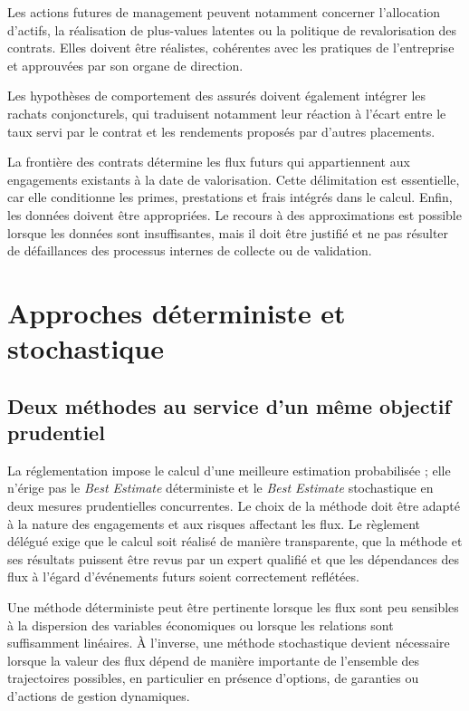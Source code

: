 Les actions futures de management peuvent notamment concerner l'allocation 
d'actifs, la réalisation de plus-values latentes ou la politique de 
revalorisation des contrats. Elles doivent être réalistes, cohérentes 
avec les pratiques de l'entreprise et approuvées par son organe de direction.

Les hypothèses de comportement des assurés doivent également intégrer les 
rachats conjoncturels, qui traduisent notamment leur réaction à l'écart entre 
le taux servi par le contrat et les rendements proposés par d'autres placements.

La frontière des contrats détermine les flux futurs qui appartiennent aux
engagements existants à la date de valorisation. Cette délimitation est
essentielle, car elle conditionne les primes, prestations et frais intégrés dans
le calcul. Enfin, les données doivent être appropriées.
Le recours à des approximations est possible lorsque les données sont
insuffisantes, mais il doit être justifié et ne pas résulter de défaillances des
processus internes de collecte ou de validation.

\section{Approches déterministe et stochastique}

\subsection{Deux méthodes au service d'un même objectif prudentiel}

La réglementation impose le calcul d'une meilleure estimation probabilisée ;
elle n'érige pas le \textit{Best Estimate} déterministe et le
\textit{Best Estimate} stochastique en deux mesures prudentielles concurrentes.
Le choix de la méthode doit être adapté à la nature des engagements et aux
risques affectant les flux. Le règlement délégué exige que le calcul soit
réalisé de manière transparente, que la méthode et ses résultats puissent être
revus par un expert qualifié et que les dépendances des flux à l'égard
d'événements futurs soient correctement reflétées.

Une méthode déterministe peut être pertinente lorsque les flux sont peu
sensibles à la dispersion des variables économiques ou lorsque les relations
sont suffisamment linéaires. À l'inverse, une méthode stochastique devient
nécessaire lorsque la valeur des flux dépend de manière importante de
l'ensemble des trajectoires possibles, en particulier en présence d'options,
de garanties ou d'actions de gestion dynamiques.

